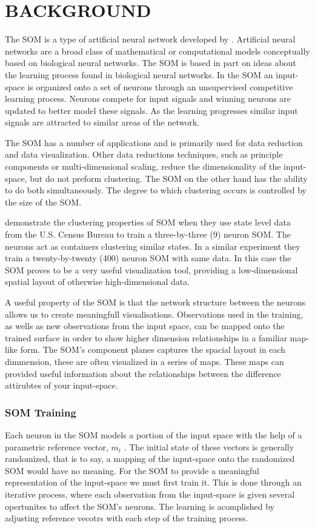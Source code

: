 
\chapter{BACKGROUND}
The SOM is a type of artificial neural network developed by \cite{Kohonen2000}. 
Artificial neural networks are a broad class of mathematical or computational
models conceptually based on biological neural networks.  The SOM is based in part
on ideas about the learning process found in biological neural networks.  In
the SOM an input-space is organized onto a set of neurons through an unsupervised
competitive learning process.  Neurons compete for input signals and winning
neurons are updated to better model these signals. As the learning progresses
similar input signals are attracted to similar areas of the network.

The SOM has a number of applications and is primarily used for data reduction
and data visualization.  Other data reductions techniques, such as principle
components or multi-dimensional scaling, reduce the dimensionality of 
the input-space, but do not preform clustering.  The SOM on the other hand has
the ability to do both simultaneously.  The degree to which clustering occurs
is controlled by the size of the SOM.

\cite{skupin08} demonstrate the clustering properties of SOM when they use
state level data from the U.S. Census Bureau to train a three-by-three (9)
neuron SOM.  The neurons act as containers clustering similar states.  In a
similar experiment they train a twenty-by-twenty (400) neuron SOM with same
data.  In this case the SOM proves to be a very useful visualization tool,
providing a low-dimensional spatial layout of otherwise high-dimensional data.

A useful property of the SOM is that the network structure between the neurons
allows us to create meaningfull visualisations.  Observations used in the
training, as wells as new observations from the input space,  can be mapped
onto the trained surface in order to show higher dimension relationships in a
familiar map-like form. The SOM's component planes captures the spacial layout
in each dimmension, these are often visualized in a series of maps.  These
maps can provided useful information about the relationships between the
difference attirubtes of your input-space.

\subsection{SOM Training}
Each neuron in the SOM models a portion of the input space with the help of a
parametric reference vector, \(m_i\) \cite{Kohonen2000}.  The initial state of
these vectors is generally randomized, that is to say, a mapping of the
input-space onto the randomized SOM would have no meaning.  For the SOM to
provide a meaningful representation of the input-space we must first train it.
This is done through an iterative process, where each observation from the
input-space is given several opertunites to affect the SOM's neurons.  The
learning is acomplished by adjusting reference vecotrs with each step of the
training process.




